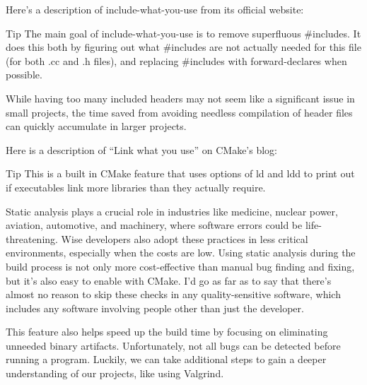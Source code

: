 
Here’s a description of include-what-you-use from its official website:

\begin{myTip}{Tip}
The main goal of include-what-you-use is to remove superfluous \#includes. It does this both by figuring out what \#includes are not actually needed for this file (for both .cc and .h files), and replacing \#includes with forward-declares when possible.
\end{myTip}

While having too many included headers may not seem like a significant issue in small projects, the time saved from avoiding needless compilation of header files can quickly accumulate in larger projects.


Here is a description of “Link what you use” on CMake's blog:

\begin{myTip}{Tip}
This is a built in CMake feature that uses options of ld and ldd to print out if executables link more libraries than they actually require.
\end{myTip}

Static analysis plays a crucial role in industries like medicine, nuclear power, aviation, automotive, and machinery, where software errors could be life-threatening. Wise developers also adopt these practices in less critical environments, especially when the costs are low. Using static analysis during the build process is not only more cost-effective than manual bug finding and fixing, but it’s also easy to enable with CMake. I’d go as far as to say that there’s almost no reason to skip these checks in any quality-sensitive software, which includes any software involving people other than just the developer.

This feature also helps speed up the build time by focusing on eliminating unneeded binary artifacts. Unfortunately, not all bugs can be detected before running a program. Luckily, we can take additional steps to gain a deeper understanding of our projects, like using Valgrind.








